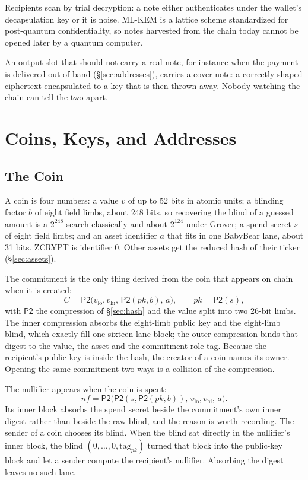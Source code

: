 \documentclass[twocolumn,10pt]{article}
\begin{document}
Recipients scan by trial decryption: a note either authenticates under the wallet's decapsulation key or it is noise. ML-KEM is a lattice scheme standardized for post-quantum confidentiality, so notes harvested from the chain today cannot be opened later by a quantum computer.

An output slot that should not carry a real note, for instance when the payment is delivered out of band (\S\ref{sec:addresses}), carries a cover note: a correctly shaped ciphertext encapsulated to a key that is then thrown away. Nobody watching the chain can tell the two apart.

\section{Coins, Keys, and Addresses}
\label{sec:coins}

\subsection{The Coin}

A coin is four numbers: a value $v$ of up to 52 bits in atomic units; a blinding factor $b$ of eight field limbs, about 248 bits, so recovering the blind of a guessed amount is a $2^{248}$ search classically and about $2^{124}$ under Grover; a spend secret $s$ of eight field limbs; and an asset identifier $a$ that fits in one BabyBear lane, about 31 bits. ZCRYPT is identifier 0. Other assets get the reduced hash of their ticker (\S\ref{sec:assets}).

The commitment is the only thing derived from the coin that appears on chain when it is created:
\[
C = \mathsf{P2}\bigl(v_{\mathrm{lo}}, v_{\mathrm{hi}},\, \mathsf{P2}(\mathit{pk}, b),\, a\bigr),
\qquad \mathit{pk} = \mathsf{P2}(s),
\]
with $\mathsf{P2}$ the compression of \S\ref{sec:hash} and the value split into two 26-bit limbs. The inner compression absorbs the eight-limb public key and the eight-limb blind, which exactly fill one sixteen-lane block; the outer compression binds that digest to the value, the asset and the commitment role tag. Because the recipient's public key is inside the hash, the creator of a coin names its owner. Opening the same commitment two ways is a collision of the compression.

The nullifier appears when the coin is spent:
\[
\mathit{nf} = \mathsf{P2}\bigl(\mathsf{P2}(s, \mathsf{P2}(\mathit{pk}, b)),\, v_{\mathrm{lo}}, v_{\mathrm{hi}},\, a\bigr).
\]
Its inner block absorbs the spend secret beside the commitment's own inner digest rather than beside the raw blind, and the reason is worth recording. The sender of a coin chooses its blind. When the blind sat directly in the nullifier's inner block, the blind $(0,\ldots,0,\mathrm{tag}_{pk})$ turned that block into the public-key block and let a sender compute the recipient's nullifier. Absorbing the digest leaves no such lane.
\end{document}
